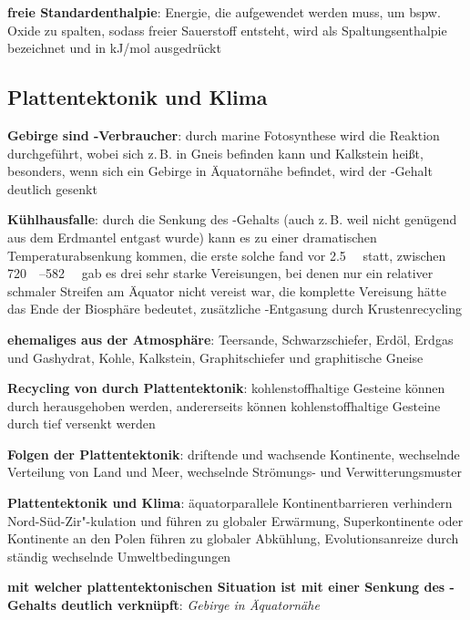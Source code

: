 \textbf{freie Standardenthalpie}:
Energie, die aufgewendet werden muss, um bspw. Oxide zu spalten, sodass freier Sauerstoff entsteht,
wird als Spaltungsenthalpie bezeichnet und in \si{\kilo\joule/\mol} ausgedrückt

\pagebreak

\subsection{%
    Plattentektonik und Klima%
}

\textbf{Gebirge sind -Verbraucher}:
durch marine Fotosynthese wird die Reaktion
 durchgeführt,
wobei sich  z.\,B. in Gneis befinden kann und  Kalkstein heißt,
besonders, wenn sich ein Gebirge in Äquatornähe befindet, wird der -Gehalt deutlich gesenkt

\textbf{Kühlhausfalle}:
durch die Senkung des -Gehalts
(auch z.\,B. weil nicht genügend  aus dem Erdmantel entgast wurde)
kann es zu einer dramatischen Temperaturabsenkung kommen,
die erste solche fand vor \SI{2.5}{\mega\year} statt,
zwischen \SIrange{720}{582}{\mega\year} gab es drei sehr starke Vereisungen,
bei denen nur ein relativer schmaler Streifen am Äquator nicht vereist war,
die komplette Vereisung hätte das Ende der Biosphäre bedeutet,
zusätzliche -Entgasung durch Krustenrecycling

\textbf{ehemaliges  aus der Atmosphäre}:
Teersande,
Schwarzschiefer,
Erdöl,
Erdgas und Gashydrat,
Kohle,
Kalkstein,
Graphitschiefer und graphitische Gneise

\textbf{Recycling von  durch Plattentektonik}:
kohlenstoffhaltige Gesteine können durch
herausgehoben werden,
andererseits können kohlenstoffhaltige Gesteine durch
tief versenkt werden

\textbf{Folgen der Plattentektonik}:
driftende und wachsende Kontinente,
wechselnde Verteilung von Land und Meer,
wechselnde Strömungs- und Verwitterungsmuster

\textbf{Plattentektonik und Klima}:
äquatorparallele Kontinentbarrieren verhindern Nord-Süd-Zir"-kulation und führen zu
globaler Erwärmung,
Superkontinente oder Kontinente an den Polen führen zu globaler Abkühlung,
Evolutionsanreize durch ständig wechselnde Umweltbedingungen

\begin{wichtig}
    \item
    \textbf{mit welcher plattentektonischen Situation ist mit einer Senkung des -Gehalts
    deutlich verknüpft}:
    \emph{Gebirge in Äquatornähe}
\end{wichtig}

